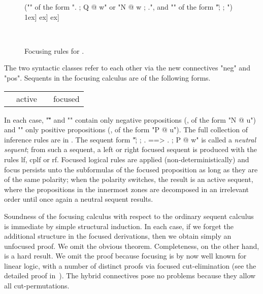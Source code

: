 \documentclass{article}
\begin{document}
\begin{figure}[p]
{\begin{minipage}{0.9\textwidth}
  ("\RR" of the form ". ; Q @ w" or "N @ w ; .", and "\LL" of the form
  "\G ; \D ; \W")
1ex]
    \quad
    \quad
    \1ex]
    \quad
    \quad
    \1ex]
    \quad
  
    \quad
    \
  \egroup
  \end{minipage}}
\caption{Focusing rules for \hyll.}
\label{fig:foc-rules}
\end{figure}

\medskip
\noindent
The two syntactic classes refer to each other via the new connectives "neg" and
"pos". Sequents in the focusing calculus are of the following forms.
\begin{center} \small
  \begin{tabular}{r@{\ }l@{\qquad}r@{\ }l}
     & active &
     & focused \\
  \end{tabular}
\end{center}
In each case, "\G" and "\D" contain only negative propositions (\ie, of the form
"N @ u") and "\W" only positive propositions (\ie, of the form "P @ u"). 
The full collection of inference rules are in \figref{foc-rules}.
The sequent form "\G ; \D ; . ==> . ; P @ w" is called a \emph{neutral sequent}; from
such a sequent, a left or right focused sequent is produced with the rules lf,
cplf or rf. Focused logical rules are applied (non-deterministically) and focus
persists unto the subformulas of the focused proposition as long as they are of
the same polarity; when the polarity switches, the result is an active sequent,
where the propositions in the innermost zones are decomposed in an irrelevant
order until once again a neutral sequent results.

Soundness of the focusing calculus with respect to the ordinary sequent calculus
is immediate by simple structural induction. In each case, if we forget the
additional structure in the focused derivations, then we obtain simply an
unfocused proof. We omit the obvious theorem. Completeness, on the other hand,
is a hard result. We omit the proof because focusing is by now well known for
linear logic, with a number of distinct proofs via focused cut-elimination (see
\eg the detailed proof in~\cite{chaudhuri08jar}). The hybrid connectives pose no
problems because they allow all cut-permutations.
\end{document}
